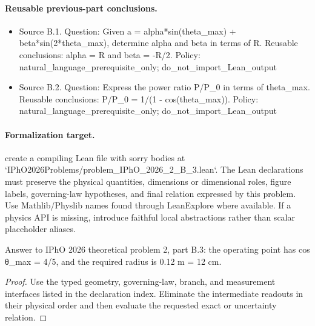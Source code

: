 \paragraph{Reusable previous-part conclusions.}
\begin{itemize}
\item Source B.1. Question: Given a = alpha*sin(theta\_max) + beta*sin(2*theta\_max), determine alpha and beta in terms of R. Reusable conclusions: alpha = R and beta = -R/2. Policy: natural\_language\_prerequisite\_only; do\_not\_import\_Lean\_output
\item Source B.2. Question: Express the power ratio P/P\_0 in terms of theta\_max. Reusable conclusions: P/P\_0 = 1/(1 - cos(theta\_max)). Policy: natural\_language\_prerequisite\_only; do\_not\_import\_Lean\_output
\end{itemize}

\paragraph{Formalization target.}
create a compiling Lean file with sorry bodies at `IPhO2026Problems/problem\_IPhO\_2026\_2\_B\_3.lean`. The Lean declarations must preserve the physical quantities, dimensions or dimensional roles, figure labels, governing-law hypotheses, and final relation expressed by this problem.
Use Mathlib/Physlib names found through LeanExplore where available. If a physics API is missing, introduce faithful local abstractions rather than scalar placeholder aliases.

\begin{theorem}
  \label{thm:physics:IPhO_2026_2_B_3:target}
  Answer to IPhO 2026 theoretical problem 2, part B.3: the operating point has cos θ\_max = 4/5, and the required radius is 0.12 m = 12 cm.
\end{theorem}
\begin{proof}
  Use the typed geometry, governing-law, branch, and measurement interfaces listed in the declaration index.  Eliminate the intermediate readouts in their physical order and then evaluate the requested exact or uncertainty relation.
\end{proof}
